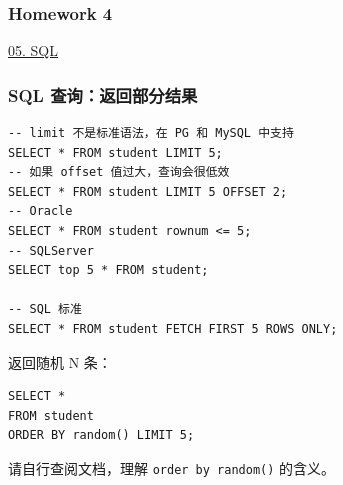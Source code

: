 \documentclass[aspectratio=169, 14pt]{beamer}
\begin{document}
\begin{frame}
    \frametitle{Homework 4}
\href{https://github.com/ChenZhongPu/db-swufe/tree/master/05_sql}{05. SQL}

\end{frame}

\begin{frame}[fragile]
    \frametitle{SQL 查询：返回部分结果}

    \begin{verbatim}
-- limit 不是标准语法，在 PG 和 MySQL 中支持
SELECT * FROM student LIMIT 5;
-- 如果 offset 值过大，查询会很低效
SELECT * FROM student LIMIT 5 OFFSET 2;
-- Oracle
SELECT * FROM student rownum <= 5;
-- SQLServer
SELECT top 5 * FROM student;

-- SQL 标准
SELECT * FROM student FETCH FIRST 5 ROWS ONLY;
    \end{verbatim}

\end{frame}

\begin{frame}[fragile]
返回随机 N 条：

\begin{verbatim}
SELECT * 
FROM student 
ORDER BY random() LIMIT 5; 
\end{verbatim}

请自行查阅文档，理解 \texttt{order by random()} 的含义。

\end{frame}
\end{document}
